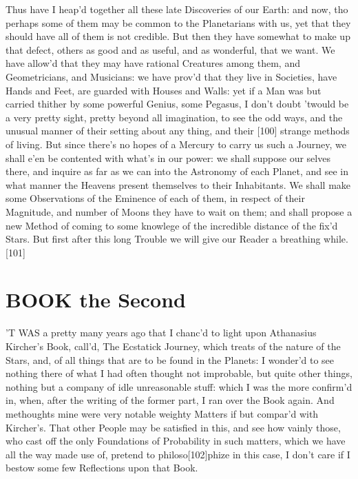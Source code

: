 \documentclass[letterpaper]{book}
\begin{document}
Thus have I heap'd together all these late Discoveries of our Earth: and
now, tho perhaps some of them may be common to the Planetarians with
us, yet that they should have all of them is not credible. But then they
have somewhat to make up that defect, others as good and as useful, and
as wonderful, that we want. We have allow'd that they may have rational
Creatures among them, and Geometricians, and Musicians: we have prov'd
that they live in Societies, have Hands and Feet, are guarded with Houses
and Walls: yet if a Man was but carried thither by some powerful Genius,
some Pegasus, I don't doubt 'twould be a very pretty sight, pretty beyond
all imagination, to see the odd ways, and the unusual manner of their setting
about any thing, and their [100] strange methods of living. But since there's
no hopes of a Mercury to carry us such a Journey, we shall e'en be contented
with what's in our power: we shall suppose our selves there, and inquire as
far as we can into the Astronomy of each Planet, and see in what manner
the Heavens present themselves to their Inhabitants. We shall make some
Observations of the Eminence of each of them, in respect of their Magnitude,
and number of Moons they have to wait on them; and shall propose a new
Method of coming to some knowlege of the incredible distance of the fix'd
Stars. But first after this long Trouble we will give our Reader a breathing
while.  [101]






\chapter{BOOK the Second}

'T WAS a pretty many years ago that I chanc'd to light upon Athanasius
Kircher's Book, call'd, The Ecstatick Journey, which treats of the nature of
the Stars, and, of all things that are to be found in the Planets: I wonder'd
to see nothing there of what I had often thought not improbable, but quite
other things, nothing but a company of idle unreasonable stuff: which I
was the more confirm'd in, when, after the writing of the former part, I
ran over the Book again. And methoughts mine were very notable weighty
Matters if but compar'd with Kircher's. That other People may be satisfied
in this, and see how vainly those, who cast off the only Foundations of
Probability in such matters, which we have all the way made use of, pretend
to philoso[102]phize in this case, I don't care if I bestow some few Reflections
upon that Book.  
\end{document}
